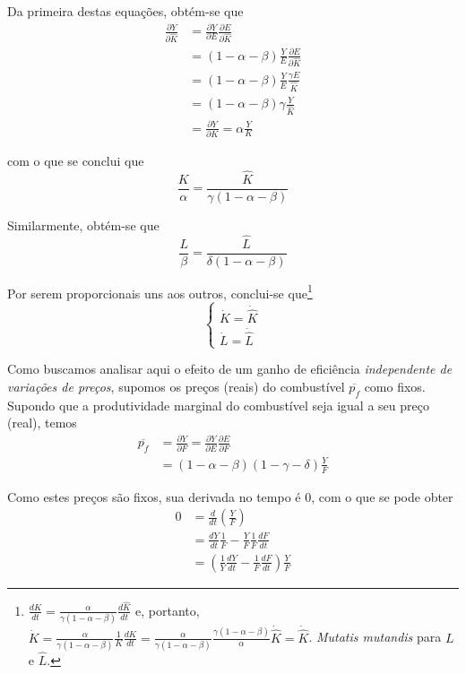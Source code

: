 Da primeira destas equações, obtém-se que
\begin{align*}
\frac{ \partial Y }{ \partial \hat{K} } &= \frac{ \partial Y }{ \partial E } \frac{ \partial E }{ \partial \hat{K} }  \\
&= (1-\alpha-\beta) \frac{Y}{E} \frac{ \partial E }{ \partial \hat{K} } \\
&= (1-\alpha-\beta) \frac{Y}{E} \frac{\gamma E}{\hat{K}} \\
&= (1-\alpha-\beta) \gamma \frac{Y}{\hat{K}} \\
&= \frac{ \partial Y }{ \partial K } = \alpha \frac{Y}{K}
\end{align*}

com o que se conclui que
$$
\frac{K}{\alpha} = \frac{\hat{K}}{\gamma (1-\alpha-\beta)}
$$

Similarmente, obtém-se que
$$
\frac{L}{\beta} = \frac{\hat{L}}{\delta(1-\alpha-\beta)}
$$

Por serem proporcionais uns aos outros, conclui-se que\footnote{$\frac{dK}{dt} =\frac{\alpha}{\gamma(1-\alpha-\beta)} \frac{d\hat{K}}{dt}$ e, portanto, $\dot{K} = \frac{\alpha}{\gamma(1-\alpha-\beta)} \frac{1}{K} \frac{d \hat{K}}{dt} = \frac{\alpha}{\gamma(1-\alpha-\beta)} \frac{\gamma(1-\alpha-\beta)}{\alpha} \dot{\hat{K}} = \dot{\hat{K}}$. \textit{Mutatis mutandis} para $L$ e $\hat{L}$. }
$$
\begin{cases}
\dot{K} = \dot{\hat{K}} \\
\dot{L} = \dot{\hat{L}}
\end{cases}
$$

Como buscamos analisar aqui o efeito de um ganho de eficiência \textit{independente de variações de preços}, supomos os preços (reais) do combustível $\overline{p_{f}}$ como fixos. Supondo que a produtividade marginal do combustível seja igual a seu preço (real), temos
\begin{align*}
\overline{p_{f}} &= \frac{ \partial Y }{ \partial F } = \frac{ \partial Y }{ \partial E }  \frac{ \partial E }{ \partial F }  \\
&= (1-\alpha-\beta) (1-\gamma-\delta) \frac{Y}{F}
\end{align*}

Como estes preços são fixos, sua derivada no tempo é $0$, com o que se pode obter
\begin{align*}
0 &= \frac{d}{dt} \left( \frac{Y}{F} \right) \\
&= \frac{dY}{dt} \frac{1}{F} - \frac{Y}{F} \frac{1}{F} \frac{dF}{dt} \\
&= \left( \frac{1}{Y} \frac{dY}{dt} - \frac{1}{F} \frac{dF}{dt} \right) \frac{Y}{F} 
\end{align*}

